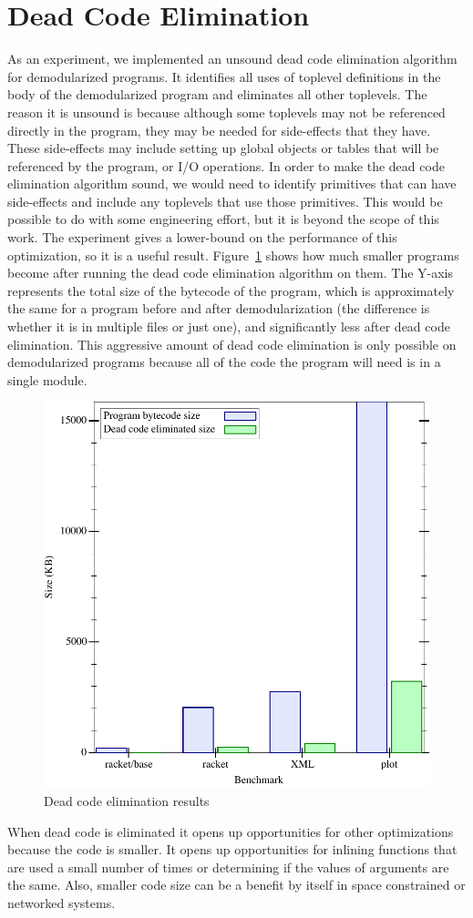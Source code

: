 \section{Dead Code Elimination}
As an experiment, we implemented an unsound dead code elimination algorithm for demodularized programs.
It identifies all uses of toplevel definitions in the body of the demodularized program and eliminates all other toplevels.
The reason it is unsound is because although some toplevels may not be referenced directly in the program, they may be needed for side-effects that they have.
These side-effects may include setting up global objects or tables that will be referenced by the program, or I/O operations.
In order to make the dead code elimination algorithm sound, we would need to identify primitives that can have side-effects and include any toplevels that use those primitives.
This would be possible to do with some engineering effort, but it is beyond the scope of this work. 
The experiment gives a lower-bound on the performance of this optimization, so it is a useful result.
Figure~\ref{fig:dead-code} shows how much smaller programs become after running the dead code elimination algorithm on them.
The Y-axis represents the total size of the bytecode of the program, which is approximately the same for a program before and after demodularization (the difference is whether it is in multiple files or just one), and significantly less after dead code elimination.
This aggressive amount of dead code elimination is only possible on demodularized programs because all of the code the program will need is in a single module. 

\begin{figure}
\includegraphics[width=.8\textwidth]{figures/gc-results}
\caption{Dead code elimination results}
\label{fig:dead-code}
\end{figure}
When dead code is eliminated it opens up opportunities for other optimizations because the code is smaller.
It opens up opportunities for inlining functions that are used a small number of times or determining if the values of arguments are the same.
Also, smaller code size can be a benefit by itself in space constrained or networked systems.

